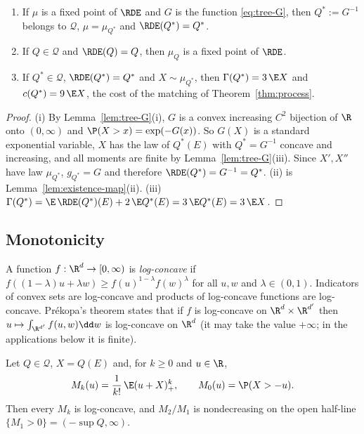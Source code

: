 \begin{lemma}\label{lem:existence-fixed}
\begin{enumerate}
\item[(i)] If $\mu$ is a fixed point of $\RDE$ and $G$ is the function \eqref{eq:tree-G}, then
$Q^*:=G^{-1}$ belongs to $\mathcal{Q}$, $\mu=\mu_{Q^*}$ and $\RDE(Q^*)=Q^*$.
\item[(ii)] If $Q\in\mathcal{Q}$ and $\RDE(Q)=Q$, then $\mu_Q$ is a fixed point of $\RDE$.
\item[(iii)] If $Q^*\in\mathcal{Q}$, $\RDE(Q^*)=Q^*$ and $X\sim\mu_{Q^*}$, then
$\Gamma(Q^*)=3\,\E X$ and $c(Q^*)=9\,\E X$, the cost of the matching of
Theorem~\ref{thm:process}.
\end{enumerate}
\end{lemma}

\begin{proof}
(i) By Lemma~\ref{lem:tree-G}(i), $G$ is a convex increasing $C^2$ bijection of $\R$ onto
$(0,\infty)$ and $\P(X>x)=\exp(-G(x))$. So $G(X)$ is a standard exponential variable, $X$ has
the law of $Q^*(E)$ with $Q^*=G^{-1}$ concave and increasing, and all moments are finite by
Lemma~\ref{lem:tree-G}(iii). Since $X',X''$ have law $\mu_{Q^*}$, $g_{Q^*}=G$ and therefore
$\RDE(Q^*)=G^{-1}=Q^*$. (ii) is Lemma~\ref{lem:existence-map}(ii). (iii)
$\Gamma(Q^*)=\E\,\RDE(Q^*)(E)+2\,\E Q^*(E)=3\,\E Q^*(E)=3\,\E X$.
\end{proof}

\subsection{Monotonicity}\label{subsec:existence-mono}

A function $f:\R^d\to[0,\infty)$ is \emph{log-concave} if
$f((1-\lambda)u+\lambda w)\ge f(u)^{1-\lambda}f(w)^{\lambda}$ for all $u,w$ and
$\lambda\in(0,1)$. Indicators of convex sets are log-concave and products of log-concave
functions are log-concave. Pr\'ekopa's theorem \cite{Prekopa73} states that if $f$ is
log-concave on $\R^{d}\times\R^{d'}$ then $u\mapsto\int_{\R^{d'}}f(u,w)\dd w$ is log-concave
on $\R^d$ (it may take the value $+\infty$; in the applications below it is finite).

\begin{lemma}\label{lem:existence-logconcave}
Let $Q\in\mathcal{Q}$, $X=Q(E)$ and, for $k\ge0$ and $u\in\R$,
\[
  M_k(u)=\frac{1}{k!}\,\E(u+X)_+^k,\qquad M_0(u)=\P(X>-u).
\]
Then every $M_k$ is log-concave, and $M_2/M_1$ is nondecreasing on the open half-line
$\{M_1>0\}=(-\sup Q,\infty)$.
\end{lemma}

